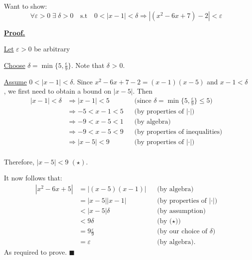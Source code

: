 \documentclass[]{article}
\begin{document}
Want to show: 
\[
    \forall \varepsilon > 0\;\exists\;\delta >0 \quad \text{s.t} \quad 
    0 < |x-1| < \delta \Longrightarrow |(x^2-6x+7)-2| < \varepsilon
\]

\underline{\bf{Proof.}}

\underline{Let} $\varepsilon > 0$ be arbitrary

\medbreak

\underline{Choose} $\delta = \min\{5, \frac{\epsilon}{9}\} $. Note that $\delta$ > 0.

\medbreak

\underline{Assume} $0 < |x-1| < \delta$.
\medbreak
Since $x^2-6x+7-2 = (x-1)(x-5)$ and $x-1 < \delta$, we first need to obtain a bound on $|x-5|$. Then
\begin{align*}
    |x-1| < \delta &\Longrightarrow |x-1|<5
        && \text{(since $\delta = \min\{ 5, \frac{\varepsilon}{9} \} \le 5$)} \\[6pt]
    &\Longrightarrow -5 < x-1 < 5
        && \text{(by properties of $|\cdot|$)} \\[6pt]
    &\Longrightarrow -9 < x-5 < 1 
        && \text{(by algebra)} \\[6pt]
    &\Longrightarrow -9 < x-5 < 9
        &&\text{(by properties of inequalities)} \\[6pt]
    &\Longrightarrow |x-5| < 9
        &&\text{(by properties of $|\cdot|$)} \\[6pt]
\end{align*}

Therefore, $|x-5| < 9$ $(\star)$.

It now follows that:
\begin{align*}
    |x^2-6x+5| &= |(x-5)(x-1)| 
        && \text{(by algebra)} \\[6pt]
    &= |x-5||x-1| 
        && \text{(by properties of $|\cdot|$)} \\[6pt]
    &< |x-5|\delta
        && \text{(by assumption)} \\[6pt]
    &< 9\delta
        && \text{(by ($\star$))} \\[6pt]
    &= 9\frac{\varepsilon}{9} 
        && \text{(by our choice of $\delta$)} \\[6pt]
    &= \varepsilon 
        && \text{(by algebra).}
\end{align*}
As required to prove. $\blacksquare$
\end{document}
